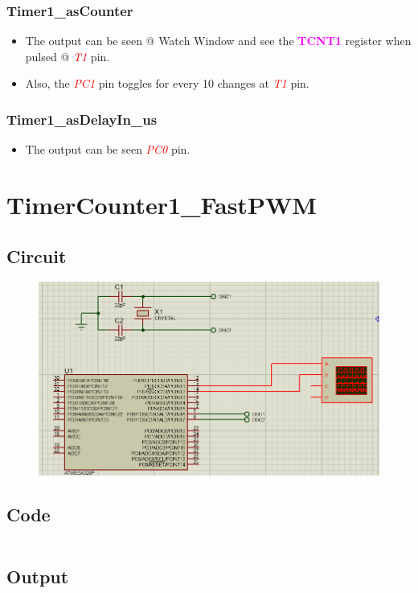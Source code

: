 \documentclass[oneside]{book}
\newcommand{\pinFormat}[1]{\emph{\textcolor{red}{#1}}}
\newcommand{\regFormat}[1]{\textbf{\textcolor{magenta}{#1}}}
\begin{document}
\subsubsection{Timer1\_asCounter}
\begin{itemize}
    \item The output can be seen @ Watch Window and see the \regFormat{TCNT1} register when pulsed @ \pinFormat{T1} pin.
    \item Also, the \pinFormat{PC1} pin toggles for every 10 changes at \pinFormat{T1} pin.
\end{itemize}
\subsubsection{Timer1\_asDelayIn\_us}
\begin{itemize}
    \item The output can be seen \pinFormat{PC0} pin.
\end{itemize}


\section{TimerCounter1\_FastPWM}
\subsection{Circuit}
\begin{figure}[H]
    \centering
    \includegraphics[height=0.2\textheight]{TimerCounter1_FastPWM.png}
\end{figure}
\subsection{Code}
\inputminted[breaklines, bgcolor=black]{c}{../programFiles/TimerCounter1_FastPWM.c}
\subsection{Output}
\end{document}
